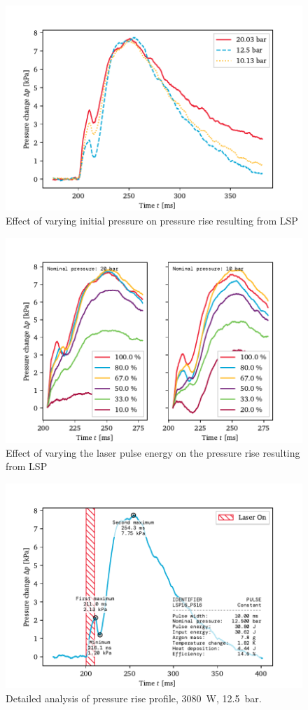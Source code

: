     \begin{figure}[h]
        \centering
        \includegraphics[]{assets/5 results/pressure_pressures}
        \caption{Effect of varying initial pressure on pressure rise resulting from LSP}
        \label{fig:pressure_pressures}
    \end{figure}

    \begin{figure}[h]
        \centering
        \includegraphics[]{assets/5 results/pressure_powers}
        \caption{Effect of varying the laser pulse energy on the pressure rise resulting from LSP}
        \label{fig:pressure_powers}
    \end{figure}

    \begin{figure}[h]
        \centering
        \includegraphics[]{assets/5 results/pressure_an_LSP16_PS16}
        \caption[Detailed analysis of pressure rise profile]{Detailed analysis of pressure rise profile, \qty{3080}{W}, \qty{12.5}{bar}.}
        \label{fig:}
    \end{figure}